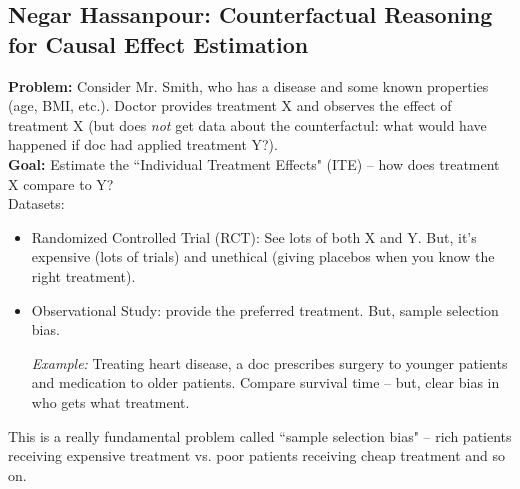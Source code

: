 \spacerule
\subsection{Negar Hassanpour: Counterfactual Reasoning for Causal Effect Estimation}

{\bf Problem:} Consider Mr. Smith, who has a disease and some known properties (age, BMI, etc.). Doctor provides treatment X and observes the effect of treatment X (but does {\it not} get data about the counterfactul: what would have happened if doc had applied treatment Y?). \\

{\bf Goal:} Estimate the ``Individual Treatment Effects" (ITE) -- how does treatment X compare to Y? \\

Datasets:
\begin{itemize}
    \item Randomized Controlled Trial (RCT): See lots of both X and Y. But, it's expensive (lots of trials) and unethical (giving placebos when you know the right treatment).
    \item Observational Study: provide the preferred treatment. But, sample selection bias.
    
    {\it Example:} Treating heart disease, a doc prescribes surgery to younger patients and medication to older patients. Compare survival time -- but, clear bias in who gets what treatment.
\end{itemize}

This is a really fundamental problem called ``sample selection bias" -- rich patients receiving expensive treatment vs. poor patients receiving cheap treatment and so on. \\

